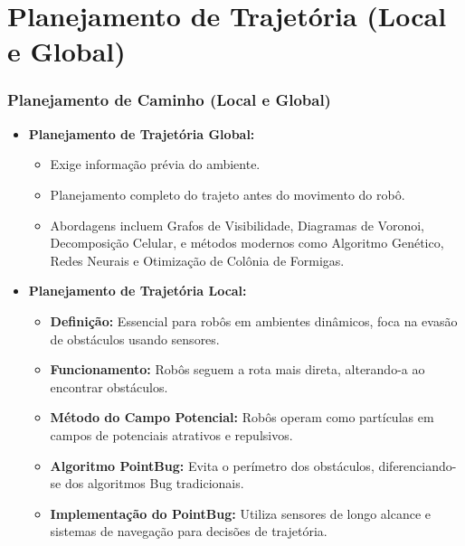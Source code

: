\documentclass[xcolor=dvipsnames, aspectratio=169]{beamer}
\begin{document}
\section{Planejamento de Trajetória (Local e Global)}
\begin{frame}
  \frametitle{Planejamento de Caminho (Local e Global)}
  \begin{itemize}
    \item \textbf{Planejamento de Trajetória Global:} 
    \begin{itemize}
        \item Exige informação prévia do ambiente.
        \item Planejamento completo do trajeto antes do movimento do robô.
        \item Abordagens incluem Grafos de Visibilidade, Diagramas de Voronoi, Decomposição Celular, e métodos modernos como Algoritmo Genético, Redes Neurais e Otimização de Colônia de Formigas.
    \end{itemize}
    \item \textbf{Planejamento de Trajetória Local:}
    \begin{itemize}
      \item \textbf{Definição:} Essencial para robôs em ambientes dinâmicos, foca na evasão de obstáculos usando sensores.
      \item \textbf{Funcionamento:} Robôs seguem a rota mais direta, alterando-a ao encontrar obstáculos.
      \item \textbf{Método do Campo Potencial:} Robôs operam como partículas em campos de potenciais atrativos e repulsivos.
      \item \textbf{Algoritmo PointBug:} Evita o perímetro dos obstáculos, diferenciando-se dos algoritmos Bug tradicionais.
      \item \textbf{Implementação do PointBug:} Utiliza sensores de longo alcance e sistemas de navegação para decisões de trajetória.
    \end{itemize}
  \end{itemize}

\end{frame}

\end{document}
